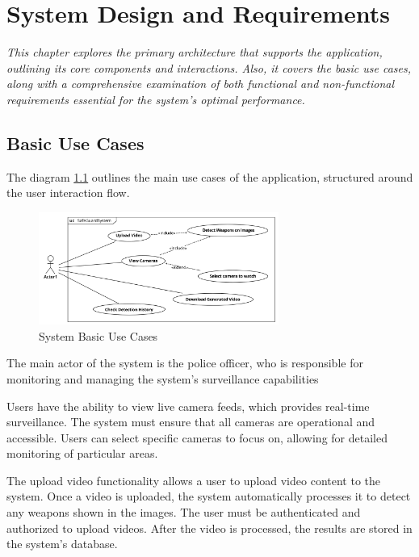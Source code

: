 \chapter{System Design and Requirements}
\label{chapter:design}

\newenvironment{design}
{\quote\itshape}
{\endquote}

\begin{design}
    This chapter explores the primary architecture that supports the application, outlining its core components and 
    interactions. Also, it covers the basic use cases, along with a comprehensive examination of both 
    functional and non-functional requirements essential for the system's optimal performance.
\end{design}

\section{Basic Use Cases}
The diagram \ref{fig:use-cases} outlines the main use cases of the application, structured around the user 
interaction flow.

\begin{figure}[h]
    \centering 
    \includegraphics[width=0.7\textwidth]{figs/use-cases4.png} 
    \caption{System Basic Use Cases}
    \label{fig:use-cases}
\end{figure}

The main actor of the system is the police officer, who is responsible for monitoring and managing the system's 
surveillance capabilities

Users have the ability to view live camera feeds, which provides real-time surveillance. The system must ensure that 
all cameras are operational and accessible. Users can select specific cameras to focus on, allowing for detailed 
monitoring of particular areas.

The upload video functionality allows a user to upload video content to the system. Once a video is uploaded, the 
system automatically processes it to detect any weapons shown in the images. The 
user must be authenticated and authorized to upload videos. After the video is processed, the 
results are stored in the system's database.

